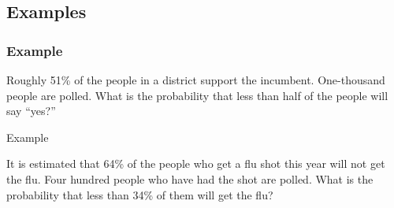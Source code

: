 \subsection{Examples}

\begin{frame}
  \frametitle{Example}

  Roughly 51\% of the people in a district support the
  incumbent. One-thousand people are polled. What is the probability
  that less than half of the people will say ``yes?''

  \vfill


\end{frame}

\begin{frame}{Example}

  It is estimated that 64\% of the people who get a flu shot this year
  will not get the flu. Four hundred people who have had the shot are
  polled. What is the probability that less than 34\% of them will get
  the flu?

    \vfill




\end{frame}



